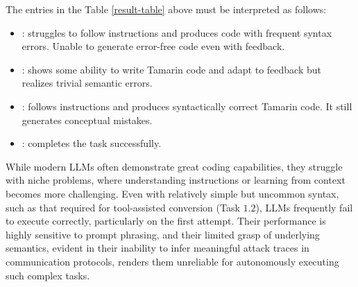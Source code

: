 \vspace{-0.5cm}
The entries in the Table \ref{result-table} above must be interpreted as follows:
\begin{itemize}
    \item {} : struggles to follow instructions and produces code with frequent syntax errors. Unable to generate error-free code even with feedback. 
    \item {} : shows some ability to write Tamarin code and adapt to feedback but realizes trivial semantic errors.
    \item {} : follows instructions and produces syntactically correct Tamarin code. It still generates conceptual mistakes.
    \item {} : completes the task successfully.
\end{itemize} 

While modern LLMs often demonstrate great coding capabilities, they struggle with niche problems, where understanding instructions or learning from context becomes more challenging. Even with relatively simple but uncommon syntax, such as that required for tool-assisted conversion (Task $1.2$), LLMs frequently fail to execute correctly, particularly on the first attempt. Their performance is highly sensitive to prompt phrasing, and their limited grasp of underlying semantics, evident in their inability to infer meaningful attack traces in communication protocols, renders them unreliable for autonomously executing such complex tasks.

